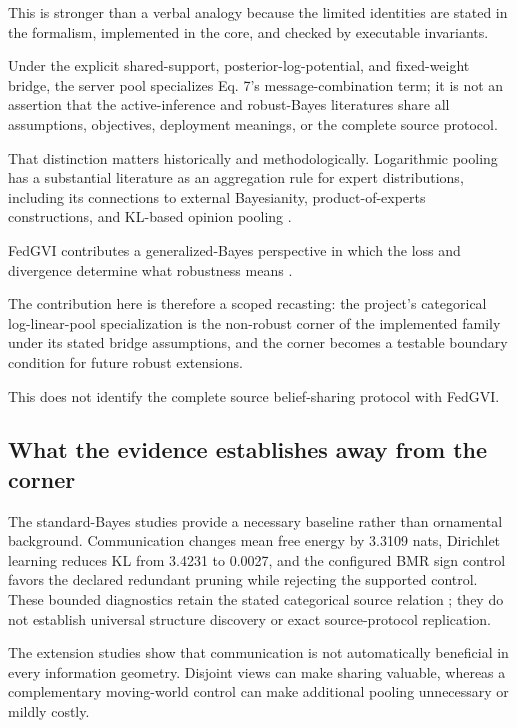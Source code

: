 \documentclass[
  english,
]{article}
\theoremstyle{plain}
\theoremstyle{definition}
\theoremstyle{remark}
\theoremstyle{definition}
\begin{document}
This is stronger than a verbal analogy because the limited identities
are stated in the formalism, implemented in the core, and checked by
executable invariants.

Under the explicit shared-support, posterior-log-potential, and
fixed-weight bridge, the server pool specializes Eq. 7's
message-combination term; it is not an assertion that the
active-inference and robust-Bayes literatures share all assumptions,
objectives, deployment meanings, or the complete source protocol.

That distinction matters historically and methodologically. Logarithmic
pooling has a substantial literature as an aggregation rule for expert
distributions, including its connections to external Bayesianity,
product-of-experts constructions, and KL-based opinion pooling
\citep{genest1986combining, genest1986externally, hinton2002products, abbas2009kullback, dietrich2021fully}.

FedGVI contributes a generalized-Bayes perspective in which the loss and
divergence determine what robustness means \citep{mildner2025fedgvi}.

The contribution here is therefore a scoped recasting: the project's
categorical log-linear-pool specialization is the non-robust corner of
the implemented family under its stated bridge assumptions, and the
corner becomes a testable boundary condition for future robust
extensions.

This does not identify the complete source belief-sharing protocol with
FedGVI.

\subsection{What the evidence establishes away from the
corner}\label{sec:conclusion-evidence}

The standard-Bayes studies provide a necessary baseline rather than
ornamental background. Communication changes mean free energy by 3.3109
nats, Dirichlet learning reduces KL from 3.4231 to 0.0027, and the
configured BMR sign control favors the declared redundant pruning while
rejecting the supported control. These bounded diagnostics retain the
stated categorical source relation \citep{friston2024federated}; they do
not establish universal structure discovery or exact source-protocol
replication.

The extension studies show that communication is not automatically
beneficial in every information geometry. Disjoint views can make
sharing valuable, whereas a complementary moving-world control can make
additional pooling unnecessary or mildly costly.
\end{document}
